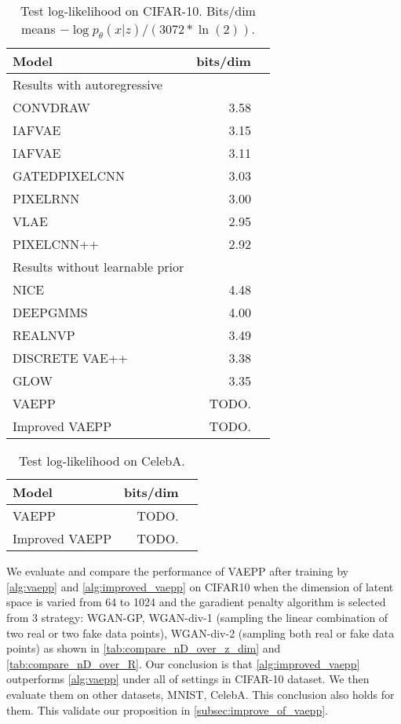 \begin{table}[tb]
\centering
\begin{tabular}{lrr}  
\toprule
Model  &  bits/dim \\
\midrule
Results with autoregressive   \\
CONVDRAW         &  3.58      \\
IAFVAE           &  3.15      \\
IAFVAE           &  3.11      \\
GATEDPIXELCNN    &  3.03      \\
PIXELRNN         &  3.00      \\
VLAE             &  2.95      \\
PIXELCNN++       &  2.92      \\
\midrule
Results without learnable prior   \\
NICE             &  4.48      \\
DEEPGMMS         &  4.00      \\
REALNVP          &  3.49      \\
DISCRETE VAE++   &  3.38      \\
GLOW             &  3.35      \\
 VAEPP           &  TODO.     \\
Improved VAEPP   &  TODO.     \\
\bottomrule
\end{tabular}
\caption{Test log-likelihood on CIFAR-10. Bits/dim means $-\log p_\theta(x|z) / (3072 * \ln(2))$.}
\label{tab:cifar-nll}
\end{table}
\begin{table}[tb]
\centering
\begin{tabular}{lrr}  
\toprule
Model  &  bits/dim \\
\midrule
VAEPP           &  TODO.     \\
Improved VAEPP   &  TODO.     \\
\bottomrule
\end{tabular}
\caption{Test log-likelihood on CelebA. }
\label{tab:cifar-nll}
\end{table}

We evaluate and compare the performance of VAEPP after training by \cref{alg:vaepp} and \cref{alg:improved_vaepp} on CIFAR10 when the dimension of latent space is varied from 64 to 1024 and the garadient penalty algorithm is selected from 3 strategy: WGAN-GP, WGAN-div-1  (sampling the linear combination of two real or two fake data points), WGAN-div-2 (sampling both real or fake data points) as shown in \cref{tab:compare_nD_over_z_dim} and \cref{tab:compare_nD_over_R}. Our conclusion is that \cref{alg:improved_vaepp} outperforms \cref{alg:vaepp} under all of settings in CIFAR-10 dataset. We then evaluate them on other datasets, MNIST, CelebA. This conclusion also holds for them. This validate our proposition in \cref{subsec:improve_of_vaepp}. 

